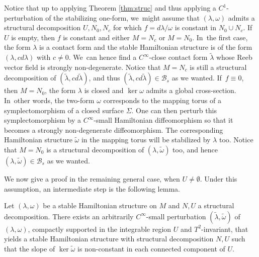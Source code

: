 Notice that up to applying Theorem \ref{thm:struc} and thus applying a $C^1$-perturbation of the stabilizing one-form, we~might assume that $(\lambda,\omega)$ admits a structural decomposition $U, N_0, N_c$ for which $f=d\lambda/\omega$ is constant in $N_0\cup N_c$. If~$U$ is empty, then $f$ is constant and either $M=N_c$ or $M=N_0$. In~the first case, the form $\lambda$ is a contact form and the stable Hamiltonian structure is of the form $(\lambda, cd\lambda)$ with $c\neq 0$. We~can hence find a $C^\infty$-close contact form $\widetilde \lambda$ whose Reeb vector field is strongly non-degenerate. Notice that $M=N_c$ is still a structural decomposition of $(\tilde \lambda, cd\tilde \lambda)$, and thus $(\tilde \lambda, cd\tilde \lambda) \in \mathcal{B}_s$ as we wanted. If~$f\equiv 0$, then $M=N_0$, the form $\lambda$ is closed and $\ker \omega$ admits a global cross-section. In~other words, the two-form $\omega$ corresponds to the mapping torus of a symplectomorphism of a closed surface $\Sigma$. One can then perturb this symplectomorphism by a $C^\infty$-small Hamiltonian diffeomorphism so that it becomes a strongly non-degenerate diffeomorphism. The corresponding Hamiltonian structure $\tilde \omega$ in the mapping torus will be stabilized by $\lambda$ too. Notice that $M=N_0$ is a structural decomposition of $(\lambda, \tilde \omega)$ too, and hence $(\lambda,\tilde \omega)\in \mathcal{B}_s$ as we wanted.

We now give a proof in the remaining general case, \ie when $U\neq \emptyset$. Under this assumption, an intermediate step is the following lemma.

\begin{lemma}\label{lem:nonconstantslope}
Let $(\lambda,\omega)$ be a stable Hamiltonian structure on $M$ and $N,U$ a structural decomposition. There exists an arbitrarily $C^\infty$-small perturbation $(\widetilde \lambda,\widetilde \omega)$ of $(\lambda,\omega)$, compactly supported in the integrable region $U$ and $T^2$-invariant, that yields a stable Hamiltonian structure with structural decomposition $N,U$ such that the slope of $\ker \widetilde \omega$ is non-constant in each connected component of $U$.
\end{lemma}


